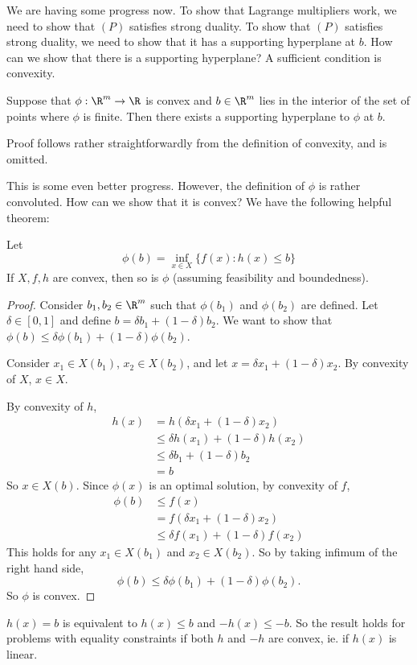 \documentclass[a4paper]{article}
\begin{document}
We are having some progress now. To show that Lagrange multipliers work, we need to show that $(P)$ satisfies strong duality. To show that $(P)$ satisfies strong duality, we need to show that it has a supporting hyperplane at $b$. How can we show that there is a supporting hyperplane? A sufficient condition is convexity.

\begin{thm}
  Suppose that $\phi: \R^m \to \R$ is convex and $b\in\R^m$ lies in the interior of the set of points where $\phi$ is finite. Then there exists a supporting hyperplane to $\phi$ at $b$.
\end{thm}
Proof follows rather straightforwardly from the definition of convexity, and is omitted.

This is some even better progress. However, the definition of $\phi$ is rather convoluted. How can we show that it is convex? We have the following helpful theorem:

\begin{thm}
  Let
  \[
    \phi(b) = \inf_{x\in X} \{f(x): h(x) \leq b\}
  \]
  If $X, f, h$ are convex, then so is $\phi$ (assuming feasibility and boundedness).
\end{thm}

\begin{proof}
  Consider $b_1, b_2\in \R^m$ such that $\phi(b_1)$ and $\phi(b_2)$ are defined. Let $\delta \in [0, 1]$ and define $b = \delta b_1 + (1 - \delta)b_2$. We want to show that $\phi(b) \leq \delta \phi(b_1) + (1 - \delta)\phi(b_2)$.

  Consider $x_1 \in X(b_1)$, $x_2 \in X(b_2)$, and let $x = \delta x_1 + (1 - \delta)x_2$. By convexity of $X$, $x\in X$.

  By convexity of $h$,
  \begin{align*}
    h(x) &= h(\delta x_1 + (1 - \delta) x_2)\\
    &\leq \delta h(x_1) + (1 - \delta)h(x_2)\\
    &\leq \delta b_1 + (1 - \delta)b_2\\
    &= b
  \end{align*}
  So $x\in X(b)$. Since $\phi(x)$ is an optimal solution, by convexity of $f$,
  \begin{align*}
    \phi(b) &\leq f(x)\\
    &= f(\delta x_1 + (1 - \delta) x_2)\\
    &\leq \delta f(x_1) + (1 - \delta)f(x_2)
   \end{align*}
   This holds for any $x_1\in X(b_1)$ and $x_2 \in X(b_2)$. So by taking infimum of the right hand side,
   \[
     \phi(b) \leq \delta \phi(b_1) + (1 - \delta) \phi(b_2).
   \]
   So $\phi$ is convex.
\end{proof}
$h(x) = b$ is equivalent to $h(x) \leq b$ and $-h(x) \leq -b$. So the result holds for problems with equality constraints if both $h$ and $-h$ are convex, ie. if $h(x)$ is linear.
\end{document}
